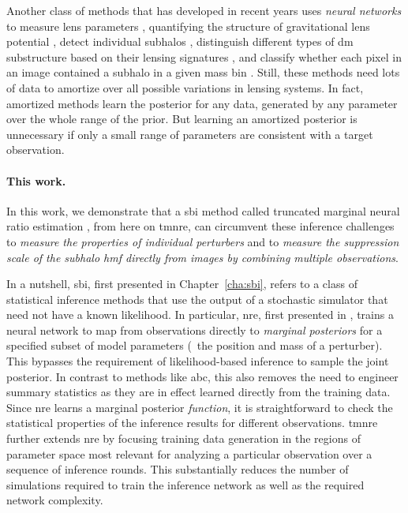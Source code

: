 Another class of methods that has developed in recent years uses \emph{neural networks} to measure lens parameters \citep{Hezaveh:2017sht, PerreaultLevasseur:2017ltk,  Morningstar:2019szx}, quantifying the structure of gravitational lens potential \citep{Vernardos:2020aa}, detect individual subhalos \citep{Rivero:2020aa}, distinguish different types of \gls*{dm} substructure based on their lensing signatures \citep{Alexander:2019puy}, and classify whether each pixel in an image contained a subhalo in a given mass bin \cite{Ostdiek:2020cqz,Ostdiek:2020mvo}. Still, these methods need lots of data to amortize over all possible variations in lensing systems. In fact, amortized methods learn the posterior for any data, generated by any parameter over the whole range of the prior. But learning an amortized posterior is unnecessary if only a small range of parameters are consistent with a target observation.


\paragraph*{This work.} In this work, we demonstrate that a \gls*{sbi} \citep{Cranmer:2019eaq} method called truncated marginal neural ratio estimation \citep{Miller:2020hua,Miller:2021aa}, from here on \gls*{tmnre}, can circumvent these inference challenges to \emph{measure the properties of individual perturbers} and to \emph{measure the suppression scale of the subhalo \gls*{hmf} directly from images by combining multiple observations}.

In a nutshell, \gls*{sbi}, first presented in Chapter~\ref{cha:sbi}, refers to a class of statistical inference methods that use the output of a stochastic simulator that need not have a known likelihood. In particular, \gls*{nre}, first presented in \cite{Hermans:2019ioj}, trains a neural network to map from observations directly to \emph{marginal posteriors} for a specified subset of model parameters (\eg~the position and mass of a perturber). This bypasses the requirement of likelihood-based inference to sample the joint posterior. In contrast to methods like \gls*{abc}, this also removes the need to engineer summary statistics \citep{He:2020rkj} as they are in effect learned directly from the training data. Since \gls*{nre} learns a marginal posterior \emph{function}, it is straightforward to check the statistical properties of the inference results for different observations. \gls*{tmnre} further extends \gls*{nre} by focusing training data generation in the regions of parameter space most relevant for analyzing a particular observation over a sequence of inference rounds. This substantially reduces the number of simulations required to train the inference network as well as the required network complexity.

